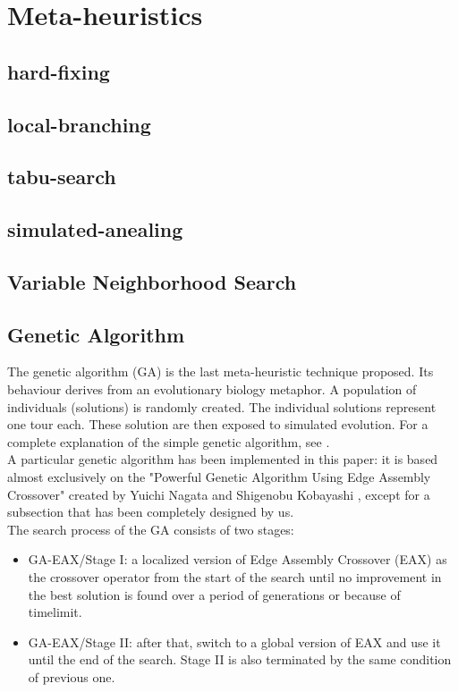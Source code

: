 \chapter{Meta-heuristics}

\section{hard-fixing}

\section{local-branching}

\section{tabu-search}

\section{simulated-anealing}

\section{Variable Neighborhood Search}

\section{Genetic Algorithm}
The genetic algorithm (GA) is the last meta-heuristic technique proposed. Its behaviour derives from an evolutionary biology metaphor. A population of individuals (solutions) is randomly created. The individual solutions represent one tour each. These solution are then exposed to simulated evolution.
For a complete explanation of the simple genetic algorithm, see \cite{phdthesis}.\\
A particular genetic algorithm has been implemented in this paper: it is based almost exclusively on the "Powerful Genetic Algorithm Using Edge Assembly Crossover" created by Yuichi Nagata and Shigenobu Kobayashi \cite{Nagata2013, Honda2013}, except for a subsection that has been completely designed by us.\\
The search process of the GA consists of two stages: \\
\begin{itemize}
\item GA-EAX/Stage I: a localized version of Edge Assembly Crossover (EAX) as the crossover operator from the start of the search until no improvement in the best solution is found over a period of generations or because of timelimit.
\item  GA-EAX/Stage II: after that, switch to a global version of EAX and use it until the end of the search. Stage II is also terminated by the same condition of previous one.
\end{itemize}

